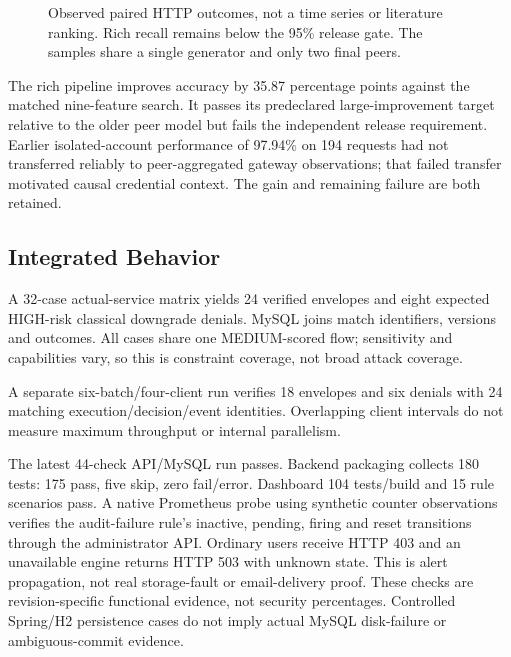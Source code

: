 \documentclass[conference,a4paper]{IEEEtran}
\begin{document}
\begin{figure}[t]
\centering
{}
\caption{Observed paired HTTP outcomes, not a time series or literature ranking. Rich recall remains below the 95\% release gate. The samples share a single generator and only two final peers.}
\label{httpgraph}
\end{figure}

The rich pipeline improves accuracy by 35.87 percentage points against the matched nine-feature search. It passes its predeclared large-improvement target relative to the older peer model but fails the independent release requirement. Earlier isolated-account performance of 97.94\% on 194 requests had not transferred reliably to peer-aggregated gateway observations; that failed transfer motivated causal credential context. The gain and remaining failure are both retained.

\subsection{Integrated Behavior}
A 32-case actual-service matrix yields 24 verified envelopes and eight expected HIGH-risk classical downgrade denials. MySQL joins match identifiers, versions and outcomes. All cases share one MEDIUM-scored flow; sensitivity and capabilities vary, so this is constraint coverage, not broad attack coverage.

A separate six-batch/four-client run verifies 18 envelopes and six denials with 24 matching execution/decision/event identities. Overlapping client intervals do not measure maximum throughput or internal parallelism.

The latest 44-check API/MySQL run passes. Backend packaging collects 180 tests: 175 pass, five skip, zero fail/error. Dashboard 104 tests/build and 15 rule scenarios pass. A native Prometheus probe using synthetic counter observations verifies the audit-failure rule's inactive, pending, firing and reset transitions through the administrator API. Ordinary users receive HTTP 403 and an unavailable engine returns HTTP 503 with unknown state. This is alert propagation, not real storage-fault or email-delivery proof. These checks are revision-specific functional evidence, not security percentages. Controlled Spring/H2 persistence cases do not imply actual MySQL disk-failure or ambiguous-commit evidence.
\end{document}
